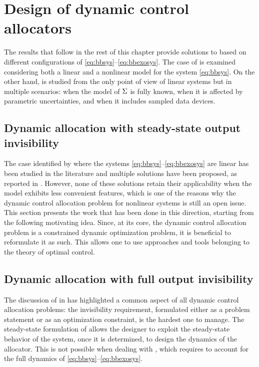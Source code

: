 \section{Design of dynamic control allocators}
\label{sec:all_design}

The results that follow in the rest of this chapter provide solutions to  based on different configurations of \eqref{eq:bbsys}--\eqref{eq:bbexosys}. The case of  is examined considering both a linear and a nonlinear model for the system \eqref{eq:bbsys}. On the other hand,  is studied from the only point of view of linear systems but in multiple scenarios: when the model of $\Sigma$ is fully known, when it is affected by parametric uncertainties, and when it includes sampled data devices.

\subsection{Dynamic allocation with steady-state output invisibility}
\label{sec:all_design_ssinv}
The case identified by  where the systems \eqref{eq:bbsys}--\eqref{eq:bbexosys} are linear has been studied in the literature and multiple solutions have been proposed, as reported in . However, none of these solutions retain their applicability when the model exhibits less convenient features, which is one of the reasons why the dynamic control allocation problem for nonlinear systems is still an open issue. This section presents the work that has been done in this direction, starting from the following motivating idea. Since, at its core, the dynamic control allocation problem is a constrained dynamic optimization problem, it is beneficial to reformulate it as such. This allows one to use approaches and tools belonging to the theory of optimal control.





\subsection{Dynamic allocation with full output invisibility}
\label{sec:all_design_fullinv}
The discussion of  in  has highlighted a common aspect of all dynamic control allocation problems: the invisibility requirement, formulated either as a problem statement or as an optimization constraint, is the hardest one to manage. The steady-state formulation of  allows the designer to exploit the steady-state behavior of the system, once it is determined, to design the dynamics of the allocator. This is not possible when dealing with , which requires to account for the full dynamics of \eqref{eq:bbsys}--\eqref{eq:bbexosys}.

